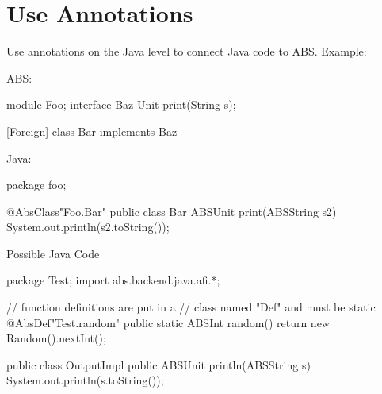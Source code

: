 \documentclass[a4paper,11pt,final]{article}
\begin{document}
\section{Use Annotations}
Use annotations on the Java level to connect Java code to ABS.
Example:
     
\noindent ABS:
\begin{absexamplen}
module Foo;
interface Baz {
  Unit print(String s);
}

[Foreign]
class Bar implements Baz { }
\end{absexamplen}     


\noindent Java:
\begin{javaexample}
package foo;

@AbsClass{"Foo.Bar"}
public class Bar {
  ABSUnit print(ABSString s2) {
    System.out.println(s2.toString());
  }
}
\end{javaexample}

\noindent Possible Java Code
\begin{javaexample}
package Test;
import abs.backend.java.afi.*;

// function definitions are put in a
// class named "Def" and must be static
@AbsDef{"Test.random"}
public static ABSInt random() {
  return new Random().nextInt();
}

public class OutputImpl {
  public ABSUnit println(ABSString s) {
    System.out.println(s.toString());
  }
}
\end{javaexample}
\end{document}
